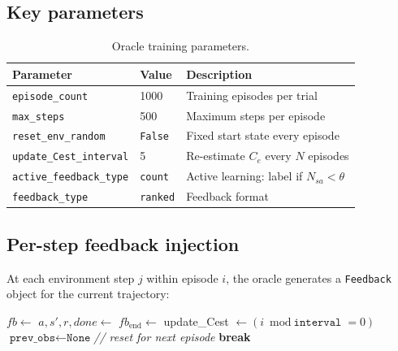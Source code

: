 \documentclass[11pt, a4paper]{article}
\begin{document}
\subsection{Key parameters}
\begin{table}[h!]
\centering
\begin{tabular}{lll}
\toprule
Parameter & Value & Description \\
\midrule
\texttt{episode\_count}       & 1000        & Training episodes per trial \\
\texttt{max\_steps}           & 500         & Maximum steps per episode \\
\texttt{reset\_env\_random}   & \texttt{False} & Fixed start state every episode \\
\texttt{update\_Cest\_interval} & 5         & Re-estimate $C_e$ every $N$ episodes \\
\texttt{active\_feedback\_type} & \texttt{count} & Active learning: label if $N_{sa} < \theta$ \\
\texttt{feedback\_type}       & \texttt{ranked} & Feedback format \\
\bottomrule
\end{tabular}
\caption{Oracle training parameters.}
\end{table}

\subsection{Per-step feedback injection}

At each environment step $j$ within episode $i$, the oracle generates a
\texttt{Feedback} object for the current trajectory:

\begin{algorithm}[H]
\caption{Oracle training loop (simplified from \texttt{main\_oracle.py})}
\begin{algorithmic}[1]
  \State {}
    \State $fb \gets$ 
    \State $a, s', r, done \gets$ 
      \State $fb_{\text{end}} \gets$ 
      \State update\_Cest $\gets (i \bmod \texttt{interval} = 0)$
      \State {}
      \State $\texttt{prev\_obs} \gets \texttt{None}$\quad\textit{// reset for next episode}
      \State \textbf{break}
    \EndIf
  \EndFor
\EndFor
\end{algorithmic}
\end{algorithm}
\end{document}
